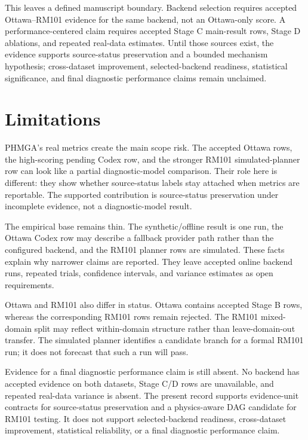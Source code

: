\documentclass[11pt]{article}
\begin{document}
This leaves a defined manuscript boundary. Backend selection requires accepted Ottawa--RM101 evidence for the same backend, not an Ottawa-only score. A performance-centered claim requires accepted Stage C main-result rows, Stage D ablations, and repeated real-data estimates. Until those sources exist, the evidence supports source-status preservation and a bounded mechanism hypothesis; cross-dataset improvement, selected-backend readiness, statistical significance, and final diagnostic performance claims remain unclaimed.

\section{Limitations}
PHMGA's real metrics create the main scope risk. The accepted Ottawa rows, the high-scoring pending Codex row, and the stronger RM101 simulated-planner row can look like a partial diagnostic-model comparison. Their role here is different: they show whether source-status labels stay attached when metrics are reportable. The supported contribution is source-status preservation under incomplete evidence, not a diagnostic-model result.

The empirical base remains thin. The synthetic/offline result is one run, the Ottawa Codex row may describe a fallback provider path rather than the configured backend, and the RM101 planner rows are simulated. These facts explain why narrower claims are reported. They leave accepted online backend runs, repeated trials, confidence intervals, and variance estimates as open requirements.

Ottawa and RM101 also differ in status. Ottawa contains accepted Stage B rows, whereas the corresponding RM101 rows remain rejected. The RM101 mixed-domain split may reflect within-domain structure rather than leave-domain-out transfer. The simulated planner identifies a candidate branch for a formal RM101 run; it does not forecast that such a run will pass.

Evidence for a final diagnostic performance claim is still absent. No backend has accepted evidence on both datasets, Stage C/D rows are unavailable, and repeated real-data variance is absent. The present record supports evidence-unit contracts for source-status preservation and a physics-aware DAG candidate for RM101 testing. It does not support selected-backend readiness, cross-dataset improvement, statistical reliability, or a final diagnostic performance claim.
\end{document}
